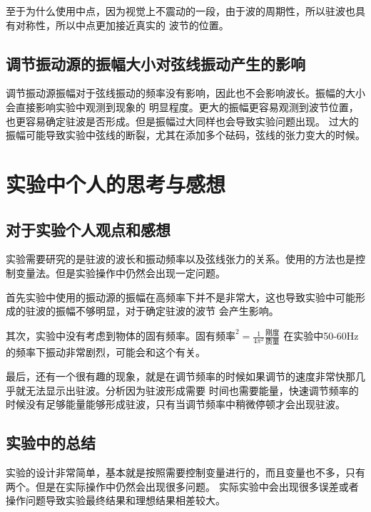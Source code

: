 \documentclass{ctexart}
\begin{document}
  至于为什么使用中点，因为视觉上不震动的一段，由于波的周期性，所以驻波也具有对称性，所以中点更加接近真实的
  波节的位置。
  \subsection{调节振动源的振幅大小对弦线振动产生的影响}
  调节振动源振幅对于弦线振动的频率没有影响，因此也不会影响波长。振幅的大小会直接影响实验中观测到现象的
  明显程度。更大的振幅更容易观测到波节位置，也更容易确定驻波是否形成。但是振幅过大同样也会导致实验问题出现。
  过大的振幅可能导致实验中弦线的断裂，尤其在添加多个砝码，弦线的张力变大的时候。
\newpage

\section{实验中个人的思考与感想}
  \subsection{对于实验个人观点和感想}
  实验需要研究的是驻波的波长和振动频率以及弦线张力的关系。使用的方法也是控制变量法。但是实验操作中仍然会出现一定问题。

  首先实验中使用的振动源的振幅在高频率下并不是非常大，这也导致实验中可能形成的驻波的振幅不够明显，对于确定驻波的波节
  会产生影响。

  其次，实验中没有考虑到物体的固有频率。$\mbox{固有频率}^2 = \frac{1}{4\pi^2} \frac{\mbox{刚度}}{\mbox{质量}}$
  在实验中50-60Hz的频率下振动非常剧烈，可能会和这个有关。

  最后，还有一个很有趣的现象，就是在调节频率的时候如果调节的速度非常快那几乎就无法显示出驻波。分析因为驻波形成需要
  时间也需要能量，快速调节频率的时候没有足够能量能够形成驻波，只有当调节频率中稍微停顿才会出现驻波。

  \subsection{实验中的总结}
  实验的设计非常简单，基本就是按照需要控制变量进行的，而且变量也不多，只有两个。但是在实际操作中仍然会出现很多问题。
  实际实验中会出现很多误差或者操作问题导致实验最终结果和理想结果相差较大。
\end{document}

